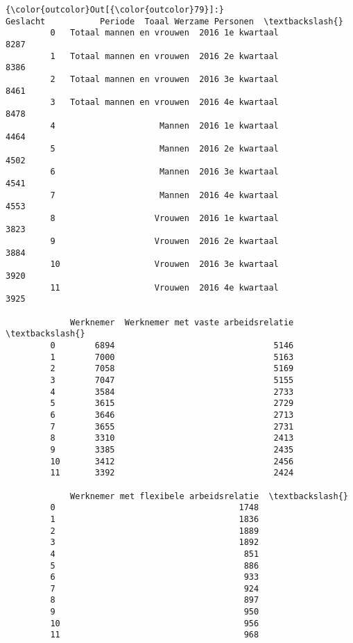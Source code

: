 \documentclass[11pt]{article}
\begin{document}
            \begin{Verbatim}[commandchars=\\\{\}]
{\color{outcolor}Out[{\color{outcolor}79}]:}                     Geslacht           Periode  Toaal Werzame Personen  \textbackslash{}
         0   Totaal mannen en vrouwen  2016 1e kwartaal                    8287   
         1   Totaal mannen en vrouwen  2016 2e kwartaal                    8386   
         2   Totaal mannen en vrouwen  2016 3e kwartaal                    8461   
         3   Totaal mannen en vrouwen  2016 4e kwartaal                    8478   
         4                     Mannen  2016 1e kwartaal                    4464   
         5                     Mannen  2016 2e kwartaal                    4502   
         6                     Mannen  2016 3e kwartaal                    4541   
         7                     Mannen  2016 4e kwartaal                    4553   
         8                    Vrouwen  2016 1e kwartaal                    3823   
         9                    Vrouwen  2016 2e kwartaal                    3884   
         10                   Vrouwen  2016 3e kwartaal                    3920   
         11                   Vrouwen  2016 4e kwartaal                    3925   
         
             Werknemer  Werknemer met vaste arbeidsrelatie  \textbackslash{}
         0        6894                                5146   
         1        7000                                5163   
         2        7058                                5169   
         3        7047                                5155   
         4        3584                                2733   
         5        3615                                2729   
         6        3646                                2713   
         7        3655                                2731   
         8        3310                                2413   
         9        3385                                2435   
         10       3412                                2456   
         11       3392                                2424   
         
             Werknemer met flexibele arbeidsrelatie  \textbackslash{}
         0                                     1748   
         1                                     1836   
         2                                     1889   
         3                                     1892   
         4                                      851   
         5                                      886   
         6                                      933   
         7                                      924   
         8                                      897   
         9                                      950   
         10                                     956   
         11                                     968   
         

\end{Verbatim}
\end{document}
